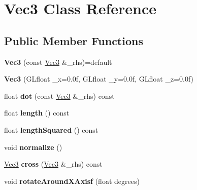 \hypertarget{classVec3}{\section{Vec3 Class Reference}
\label{classVec3}
}
\subsection*{Public Member Functions}
\begin{DoxyCompactItemize}
\item 
\hypertarget{classVec3_a42149bc6fb27116cec34c0bf9d41b096}{{\bfseries Vec3} (const \hyperlink{classVec3}{Vec3} \&\-\_\-rhs)=default}\label{classVec3_a42149bc6fb27116cec34c0bf9d41b096}

\item 
\hypertarget{classVec3_a430e79b181cdcf9fb2b0459d9d609563}{{\bfseries Vec3} (G\-Lfloat \-\_\-x=0.\-0f, G\-Lfloat \-\_\-y=0.\-0f, G\-Lfloat \-\_\-z=0.\-0f)}\label{classVec3_a430e79b181cdcf9fb2b0459d9d609563}

\item 
\hypertarget{classVec3_a033d1bb50bc8c3e5d03bb90242f671dc}{float {\bfseries dot} (const \hyperlink{classVec3}{Vec3} \&\-\_\-rhs) const }\label{classVec3_a033d1bb50bc8c3e5d03bb90242f671dc}

\item 
\hypertarget{classVec3_a17b354d08f44a6cad8e435aea73ae7f9}{float {\bfseries length} () const }\label{classVec3_a17b354d08f44a6cad8e435aea73ae7f9}

\item 
\hypertarget{classVec3_af34508ce91419757caf6481c654dc08b}{float {\bfseries length\-Squared} () const }\label{classVec3_af34508ce91419757caf6481c654dc08b}

\item 
\hypertarget{classVec3_a3a6631559d1d36eaf34ca586ce86ede1}{void {\bfseries normalize} ()}\label{classVec3_a3a6631559d1d36eaf34ca586ce86ede1}

\item 
\hypertarget{classVec3_a0914b708a219db3d38ff2fcc1d8a766e}{\hyperlink{classVec3}{Vec3} {\bfseries cross} (\hyperlink{classVec3}{Vec3} \&\-\_\-rhs) const }\label{classVec3_a0914b708a219db3d38ff2fcc1d8a766e}

\item 
\hypertarget{classVec3_a425331dd9d20a3a9b9354303e7fa7ad1}{void {\bfseries rotate\-Around\-X\-Axisf} (float degrees)}\label{classVec3_a425331dd9d20a3a9b9354303e7fa7ad1}


\end{DoxyCompactItemize}
